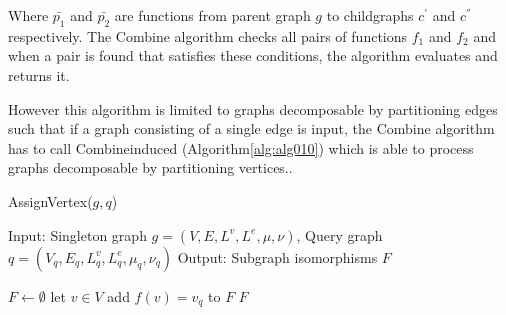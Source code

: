 Where $\bar{p_1}$ and $\bar{p_2}$ are functions from parent graph $g$ to childgraphs $c^{'}$ and $c^{''}$ respectively.
The Combine algorithm checks all pairs of functions $f_1$ and $f_2$ and when a pair is found that satisfies these conditions, the algorithm evaluates and returns it.

However this algorithm is limited to graphs decomposable by partitioning edges such that if a graph consisting of a single edge
is input, the Combine algorithm has to call Combineinduced (Algorithm\ref{alg:alg010}) which is able to process graphs decomposable by partitioning vertices..

\begin{algorithm}
\caption{AssignVertex($g,q$)}
\label{alg:alg07}
\begin{algorithmic}
\STATE Input: Singleton graph $g=(V,E,L^v ,L^e ,\mu,\nu)$, Query graph $q=(V_q,E_q,L_q^v ,L_q^e ,\mu_q,\nu_q)$ 
\STATE Output: Subgraph isomorphisms $F$
\end{algorithmic}
\begin{algorithmic}[1]
\STATE $F \leftarrow \emptyset$
\STATE let $v \in V$
		\STATE add $f(v) = v_q$ to $F$
	\ENDIF
\ENDFOR
\RETURN $F$
\end{algorithmic}
\end{algorithm}

